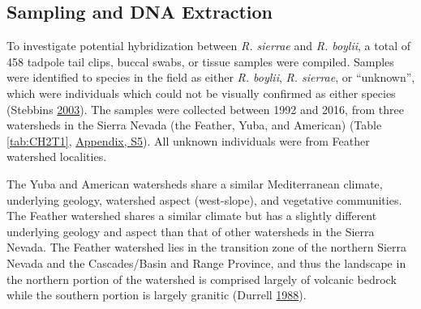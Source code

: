 \documentclass[proquest,12pt,final]{ucthesis-CA2012} %
\begin{document}
\begin{ucmainmatter}
\hypertarget{ch2samplecollection}{%
\subsection{Sampling and DNA Extraction}\label{ch2samplecollection}}

To investigate potential hybridization between \emph{R. sierrae} and
\emph{R. boylii}, a total of 458 tadpole tail clips, buccal swabs, or
tissue samples were compiled. Samples were identified to species in the
field as either \emph{R. boylii}, \emph{R. sierrae}, or ``unknown'',
which were individuals which could not be visually confirmed as either
species (Stebbins \protect\hyperlink{ref-stebbins_field_2003}{2003}).
The samples were collected between 1992 and 2016, from three watersheds
in the Sierra Nevada (the Feather, Yuba, and American) (Table
\ref{tab:CH2T1}, \protect\hyperlink{supptables}{Appendix, S5}). All
unknown individuals were from Feather watershed localities.

The Yuba and American watersheds share a similar Mediterranean climate,
underlying geology, watershed aspect (west-slope), and vegetative
communities. The Feather watershed shares a similar climate but has a
slightly different underlying geology and aspect than that of other
watersheds in the Sierra Nevada. The Feather watershed lies in the
transition zone of the northern Sierra Nevada and the Cascades/Basin and
Range Province, and thus the landscape in the northern portion of the
watershed is comprised largely of volcanic bedrock while the southern
portion is largely granitic (Durrell
\protect\hyperlink{ref-durrell_geologic_1988}{1988}).

\clearpage


\end{ucmainmatter}
\end{document}
